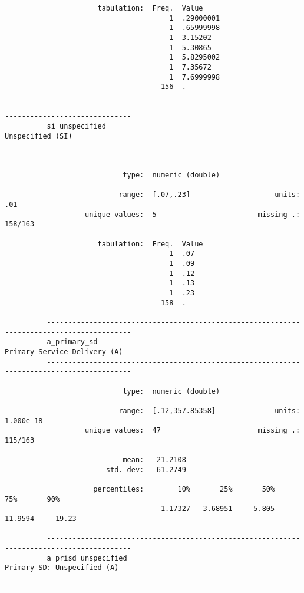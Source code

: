 \documentclass{article}
\begin{document}
\begin{verbatim}
                      tabulation:  Freq.  Value
                                       1  .29000001
                                       1  .65999998
                                       1  3.15202
                                       1  5.30865
                                       1  5.8295002
                                       1  7.35672
                                       1  7.6999998
                                     156  .
          
          ------------------------------------------------------------------------------------------
          si_unspecified                                                            Unspecified (SI)
          ------------------------------------------------------------------------------------------
          
                            type:  numeric (double)
          
                           range:  [.07,.23]                    units:  .01
                   unique values:  5                        missing .:  158/163
          
                      tabulation:  Freq.  Value
                                       1  .07
                                       1  .09
                                       1  .12
                                       1  .13
                                       1  .23
                                     158  .
          
          ------------------------------------------------------------------------------------------
          a_primary_sd                                                  Primary Service Delivery (A)
          ------------------------------------------------------------------------------------------
          
                            type:  numeric (double)
          
                           range:  [.12,357.85358]              units:  1.000e-18
                   unique values:  47                       missing .:  115/163
          
                            mean:   21.2108
                        std. dev:   61.2749
          
                     percentiles:        10%       25%       50%       75%       90%
                                     1.17327   3.68951     5.805   11.9594     19.23
          
          ------------------------------------------------------------------------------------------
          a_prisd_unspecified                                            Primary SD: Unspecified (A)
          ------------------------------------------------------------------------------------------
          

\end{verbatim}
\end{document}

